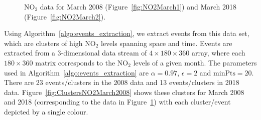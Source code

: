 \documentclass[a4paper,11pt]{article}
\begin{document}
\begin{figure}[!htb]
	\centering
	\caption{$\text{NO}_2$ data for March 2008 (Figure~\ref{fig:NO2March1})  and March 2018 (Figure~\ref{fig:NO2March2}). }
	\label{fig:NO2March2008}
\end{figure}

Using Algorithm~\ref{algo:events_extraction}, we extract events from this data set, which are clusters of high $\text{NO}_2$ levels spanning space and time. Events are extracted from a 3-dimensional data stream of $4 \times 180 \times 360$ array, where each $180 \times 360$ matrix corresponds to the $\text{NO}_2$ levels of a given month. The parameters used in Algorithm~\ref{algo:events_extraction} are $\alpha = 0.97$, $\epsilon=2$ and $\text{minPts} = 20$. There are 23 events/clusters in the 2008 data and 13 events/clusters in 2018 data. Figure~\ref{fig:ClustersNO2March2008} shows these clusters for March 2008 and 2018 (corresponding to the data in Figure~\ref{fig:NO2March2008}) with each cluster/event depicted by a single colour. 
\end{document}
